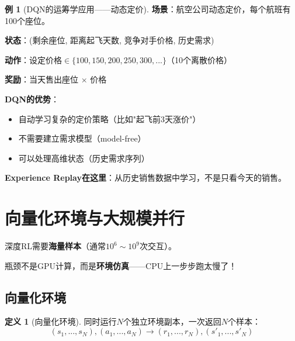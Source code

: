\documentclass[11pt,a4paper]{article}
\theoremstyle{definition}
\newtheorem{definition}{定义}[section]
\newtheorem{example}{例}[section]
\begin{document}
\begin{example}[DQN的运筹学应用——动态定价]
\textbf{场景}：航空公司动态定价，每个航班有100个座位。

\textbf{状态}：(剩余座位, 距离起飞天数, 竞争对手价格, 历史需求)

\textbf{动作}：设定价格$\in \{100, 150, 200, 250, 300, ...\}$（10个离散价格）

\textbf{奖励}：当天售出座位 $\times$ 价格

\textbf{DQN的优势}：
\begin{itemize}
    \item 自动学习复杂的定价策略（比如"起飞前3天涨价"）
    \item 不需要建立需求模型（model-free）
    \item 可以处理高维状态（历史需求序列）
\end{itemize}

\textbf{Experience Replay在这里}：从历史销售数据中学习，不是只看今天的销售。
\end{example}

\section{向量化环境与大规模并行}

\begin{plainwords}[深度RL的瓶颈]
深度RL需要\textbf{海量样本}（通常$10^6 \sim 10^9$次交互）。

瓶颈不是GPU计算，而是\textbf{环境仿真}——CPU上一步步跑太慢了！
\end{plainwords}

\subsection{向量化环境}

\begin{definition}[向量化环境]
同时运行$N$个独立环境副本，一次返回$N$个样本：
\[
(s_1, ..., s_N), (a_1, ..., a_N) \to (r_1, ..., r_N), (s'_1, ..., s'_N)
\]
\end{definition}
\end{document}

